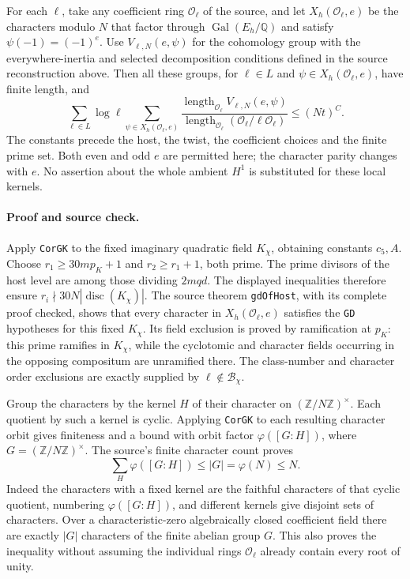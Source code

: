 For each \(\ell\), take any coefficient ring \(\mathcal O_\ell\) of the
source, and let \(X_h(\mathcal O_\ell,e)\) be the characters modulo
\(N\) that factor through \(\operatorname{Gal}(E_h/\mathbb Q)\) and
satisfy \(\psi(-1)=(-1)^e\).  Use \(V_{\ell,N}(e,\psi)\) for the
cohomology group with the everywhere-inertia and selected decomposition
conditions defined in the source reconstruction above.  Then all these
groups, for \(\ell\in L\) and \(\psi\in X_h(\mathcal O_\ell,e)\),
have finite length, and
\begin{equation}\label{eq:host-case-one-bound}
 \sum_{\ell\in L}\log\ell\!
 \sum_{\psi\in X_h(\mathcal O_\ell,e)}
 \frac{\operatorname{length}_{\mathcal O_\ell}
                   V_{\ell,N}(e,\psi)}
      {\operatorname{length}_{\mathcal O_\ell}
                   (\mathcal O_\ell/\ell\mathcal O_\ell)}
 \le (Nt)^C.
\end{equation}
The constants precede the host, the twist, the coefficient choices and
the finite prime set.  Both even and odd \(e\) are permitted here;
the character parity changes with \(e\).  No assertion about the whole
ambient \(H^1\) is substituted for these local kernels.

\paragraph{Proof and source check.}
Apply \texttt{CorGK} to the fixed imaginary quadratic field
\(K_\chi\), obtaining constants \(c_5,A\).  Choose
\(r_1\ge30mp_K+1\) and \(r_2\ge r_1+1\), both prime.
The prime divisors of the host level are among those dividing \(2mqd\).
The displayed inequalities therefore ensure
\(r_i\nmid30N|\operatorname{disc}(K_\chi)|\).
The source theorem \texttt{gdOfHost}, with its complete proof checked,
shows that every character in \(X_h(\mathcal O_\ell,e)\) satisfies the
\texttt{GD} hypotheses for this fixed \(K_\chi\).  Its field exclusion
is proved by ramification at \(p_K\): this prime ramifies in
\(K_\chi\), while the cyclotomic and character fields occurring in the
opposing compositum are unramified there.  The class-number and character
order exclusions are exactly supplied by \(\ell\notin\mathcal B_\chi\).

Group the characters by the kernel \(H\) of their character on
\((\mathbb Z/N\mathbb Z)^\times\).  Each quotient by such a kernel is
cyclic.  Applying \texttt{CorGK} to each resulting character orbit gives
finiteness and a bound with orbit factor \(\varphi([G:H])\), where
\(G=(\mathbb Z/N\mathbb Z)^\times\).  The source's finite character
count proves
\[
 \sum_H\varphi([G:H])\le |G|=\varphi(N)\le N.
\]
Indeed the characters with a fixed kernel are the faithful characters
of that cyclic quotient, numbering \(\varphi([G:H])\), and different
kernels give disjoint sets of characters.  Over a characteristic-zero
algebraically closed coefficient field there are exactly \(|G|\)
characters of the finite abelian group \(G\).  This also proves the
inequality without assuming the individual rings \(\mathcal O_\ell\)
already contain every root of unity.

